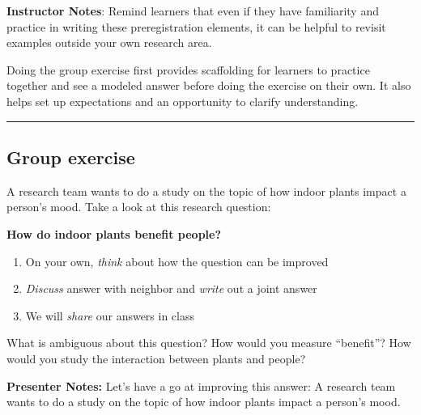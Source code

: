 \documentclass[
  letterpaper,
  DIV=11,
  numbers=noendperiod]{scrartcl}
\providecommand{\tightlist}{%
  \setlength{\itemsep}{0pt}\setlength{\parskip}{0pt}}
\begin{document}
\textbf{Instructor Notes}: Remind learners that even if they have
familiarity and practice in writing these preregistration elements, it
can be helpful to revisit examples outside your own research area.

Doing the group exercise first provides scaffolding for learners to
practice together and see a modeled answer before doing the exercise on
their own. It also helps set up expectations and an opportunity to
clarify understanding.

\begin{center}\rule{0.5\linewidth}{0.5pt}\end{center}

\subsection{Group exercise}\label{group-exercise}

A research team wants to do a study on the topic of how indoor plants
impact a person's mood. Take a look at this research question:

\textbf{How do indoor plants benefit people?}

\begin{enumerate}
\def\labelenumi{\arabic{enumi}.}
\tightlist
\item
  On your own, \emph{think} about how the question can be improved
\item
  \emph{Discuss} answer with neighbor and \emph{write} out a joint
  answer
\item
  We will \emph{share} our answers in class
\end{enumerate}

\begin{tcolorbox}[enhanced jigsaw, arc=.35mm, bottomrule=.15mm, bottomtitle=1mm, breakable, colback=white, colbacktitle=quarto-callout-tip-color!10!white, colframe=quarto-callout-tip-color-frame, coltitle=black, left=2mm, leftrule=.75mm, opacityback=0, opacitybacktitle=0.6, rightrule=.15mm, title=\textcolor{quarto-callout-tip-color}{\faLightbulb}\hspace{0.5em}{Guiding questions}, titlerule=0mm, toprule=.15mm, toptitle=1mm]

What is ambiguous about this question? How would you measure
``benefit''? How would you study the interaction between plants and
people?

\end{tcolorbox}

\textbf{Presenter Notes:} Let's have a go at improving this answer: A
research team wants to do a study on the topic of how indoor plants
impact a person's mood.
\end{document}
